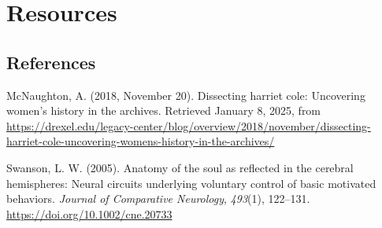 \documentclass[
  letterpaper,
  DIV=11,
  numbers=noendperiod]{scrartcl}
\newlength{\cslhangindent}
\newenvironment{CSLReferences}[2] %
 {\begin{list}{}{%
  \setlength{\itemindent}{0pt}
  \setlength{\leftmargin}{0pt}
  \setlength{\parsep}{0pt}
  \ifodd #1
   \setlength{\leftmargin}{\cslhangindent}
   \setlength{\itemindent}{-1\cslhangindent}
  \fi
  \setlength{\itemsep}{#2\baselineskip}}}
 {\end{list}}
\begin{document}
\section{Resources}\label{resources}

\subsection*{References}\label{references}

\label{refs}
\begin{CSLReferences}{1}{0}
McNaughton, A. (2018, November 20). Dissecting harriet cole: Uncovering
women's history in the archives. Retrieved January 8, 2025, from
\url{https://drexel.edu/legacy-center/blog/overview/2018/november/dissecting-harriet-cole-uncovering-womens-history-in-the-archives/}

Swanson, L. W. (2005). Anatomy of the soul as reflected in the cerebral
hemispheres: Neural circuits underlying voluntary control of basic
motivated behaviors. \emph{Journal of Comparative Neurology},
\emph{493}(1), 122--131. \url{https://doi.org/10.1002/cne.20733}

\end{CSLReferences}
\end{document}
